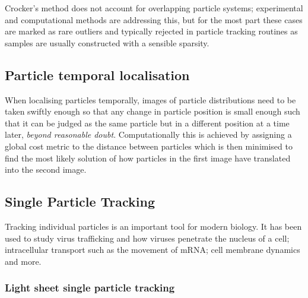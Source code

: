 Crocker's method does not account for overlapping particle systems; experimental and computational methods are addressing this\cite{Serge2008}, but for the most part these cases are marked as rare outliers and typically rejected in particle tracking routines as samples are usually constructed with a sensible sparsity.


\subsection{Particle temporal localisation}


When localising particles temporally, images of particle distributions need to be taken swiftly enough so that any change in particle position is small enough such that it can be judged as the same particle but in a different position at a  time later, \textit{beyond reasonable doubt}.
Computationally this is achieved by assigning a global cost metric to the distance between particles which is then minimised to find the most likely solution of how particles in the first image have translated into the second image.

\subsection{Single Particle Tracking}

Tracking individual particles is an important tool for modern biology.
It has been used to study virus trafficking and how viruses penetrate the nucleus of a cell\cite{Brandenburg2007}; intracellular transport such as the movement of mRNA\cite{Spille2015a}; cell membrane dynamics\cite{Cognet2014} and more.


\subsubsection{Light sheet single particle tracking}

